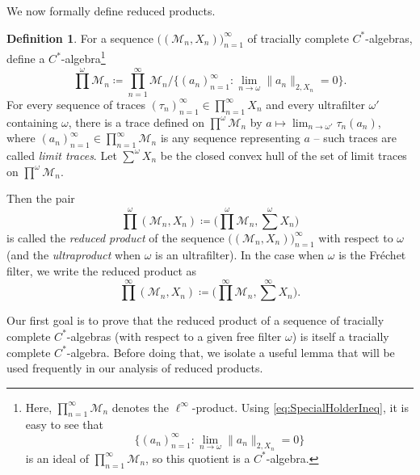 \documentclass[a4paper,11pt]{amsart}
\theoremstyle{definition}
\newtheorem{definition}[theorem]{Definition}
\numberwithin{equation}{section}
\numberwithin{theorem}{section}
\newcommand{\M}{\mathcal{M}}
\begin{document}
We now formally define reduced products.
\begin{definition}\label{def:reduced-product}
For a sequence $\big((\M_n,X_n)\big)_{n=1}^\infty$ of tracially complete $C^*$-algebras, define a $C^*$-algebra\footnote{
Here, $\prod_{n=1}^\infty \M_n$ denotes the $\ell^\infty$-product.  Using \eqref{eq:SpecialHolderIneq}, it is easy to see that \begin{equation*}
    \big\{(a_n)_{n=1}^\infty: \lim_{n\to\omega} \|a_n\|_{2,X_n} = 0\big\}
\end{equation*} 
is an ideal of $\prod_{n=1}^\infty \M_n$, so this quotient is a $C^*$-algebra.}
\begin{equation}
\prod^\omega \M_n \coloneqq  \prod_{n=1}^\infty \M_n \big/ \big\{(a_n)_{n=1}^\infty: \lim_{n\to\omega} \|a_n\|_{2,X_n} = 0\big\}.
\end{equation}
For every sequence of traces $(\tau_n)_{n=1}^\infty \in \prod_{n=1}^\infty X_n$ and every ultrafilter $\omega'$ containing $\omega$, there is a trace defined on $\prod^\omega \M_n$ by $a \mapsto \lim_{n \rightarrow \omega'} \tau_n(a_n)$, where $(a_n)_{n=1}^\infty \in \prod_{n=1}^\infty \M_n$ is any sequence representing $a$ -- such traces are called \emph{limit traces}. Let $\sum^\omega X_n$ be the closed convex hull of the set of limit traces on $\prod^\omega \M_n$.

Then the pair
\begin{equation}
 \prod^\omega (\M_n,X_n) \coloneqq \Big(\prod^\omega \M_n, \sum^\omega X_n\Big)
\end{equation}
is called the \emph{reduced product} of the sequence $\big((\M_n, X_n)\big)_{n=1}^\infty$ with respect to $\omega$ (and the \emph{ultraproduct} when $\omega$ is an ultrafilter).  In the case when $\omega$ is the Fr\'echet filter, we write the reduced product as
\begin{equation}
\prod^\infty (\M_n, X_n) \coloneqq \Big( \prod^\infty \M_n, \sum^\infty X_n \Big).
\end{equation}
\end{definition}

Our first goal is to prove that the reduced product of a sequence of tracially complete $C^*$-algebras (with respect to a given free filter $\omega$) is itself a tracially complete $C^*$-algebra. Before doing that, we isolate a useful lemma that will be used frequently in our analysis of reduced products.  
\end{document}
